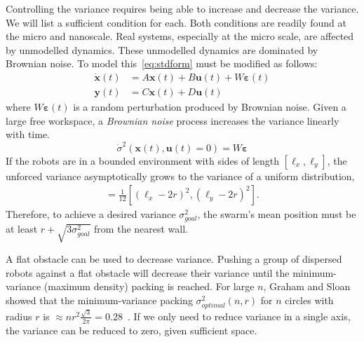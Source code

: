 Controlling the variance requires being able to increase and decrease the variance.  We will list a sufficient condition for each. Both conditions are readily found at the micro and nanoscale. 
Real systems, especially at the micro scale, are affected by unmodelled dynamics. These unmodelled dynamics are dominated by Brownian noise. To model this~\eqref{eq:stdform} must be modified as follows:
\begin{align}
\dot{\mathbf{x}}(t)  &=  A \mathbf{x}(t) + B \mathbf{u}(t) + W \bm{\varepsilon}(t)\\
 \mathbf{y}(t) &= C  \mathbf{x}(t) + D  \mathbf{u}(t)\nonumber
\end{align}
where $W\bm{\varepsilon}(t)$ is a random perturbation produced by Brownian noise. Given a large free workspace, a \emph{Brownian noise} process increases the variance linearly with time.
\begin{equation*}\dot{\sigma}^2(\mathbf{x}(t), \mathbf{u}(t) = 0)  = W \bm{\varepsilon} \end{equation*}
If the robots are in a bounded environment with sides of length $[\ell_x, \ell_y]$, the unforced variance asymptotically grows to the variance of a uniform distribution,
\begin{align}
[\sigma_x^2,\sigma_y^2] = \frac{1}{12}[ (\ell_x - 2 r)^2,(\ell_y - 2 r)^2].\label{eq:VarianceUniformDistribution}
\end{align}
 Therefore, to achieve a desired variance $\sigma^2_{goal}$, the swarm's mean position must be at least $r+\sqrt{3 \sigma^2_{goal}}$ from the nearest wall.

 A flat obstacle can be used to decrease variance. Pushing a group of dispersed robots against a flat obstacle will decrease their variance until the minimum-variance (maximum density) packing  is reached. For large $n$, Graham and Sloan showed that the minimum-variance packing  $\sigma^2_{optimal}(n,r)$ for $n$ circles with radius $r$ is $\approx 
  n r^2 \frac{\sqrt{3}}{2 \pi} = 0.28$~\cite{graham1990penny}. 
If we only need to reduce variance in a single axis, the variance can be reduced to zero, given sufficient space.

